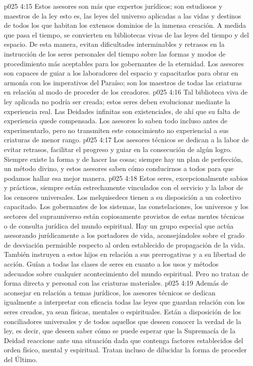 \vs p025 4:15 Estos asesores son más que expertos jurídicos; son estudiosos y maestros de la ley  esto es, las leyes del universo aplicadas a las vidas y destinos de todos los que habitan los extensos dominios de la inmensa creación. A medida que pasa el tiempo, se convierten en bibliotecas vivas de las leyes del tiempo y del espacio. De esta manera, evitan dificultades interminables y retrasos en la instrucción de los seres personales del tiempo sobre las formas y modos de procedimiento más aceptables para los gobernantes de la eternidad. Los asesores son capaces de guiar a los laboradores del espacio y capacitarlos para obrar en armonía con los imperativos del Paraíso; son los maestros de todas las criaturas en relación al modo de proceder de los creadores.
\vs p025 4:16 Tal biblioteca viva de ley aplicada no podría ser creada; estos seres deben evolucionar mediante la experiencia real. Las Deidades infinitas son existenciales, de ahí que su falta de experiencia quede compensada. Los asesores lo saben todo incluso antes de experimentarlo, pero no transmiten este conocimiento no experiencial a sus criaturas de menor rango.
\vs p025 4:17 \pc Los asesores técnicos se dedican a la labor de evitar retrasos, facilitar el progreso y guiar en la consecución de algún logro. Siempre existe la forma  y  de hacer las cosas; siempre hay un plan de perfección, un método divino, y estos asesores saben cómo conducirnos a todos para que podamos hallar esa mejor manera.
\vs p025 4:18 Estos seres, excepcionalmente sabios y prácticos, siempre están estrechamente vinculados con el servicio y la labor de los censores universales. Los melquisedecs tienen a su disposición a un colectivo capacitado. Los gobernantes de los sistemas, las constelaciones, los universos y los sectores del suprauniverso están copiosamente provistos de estas mentes técnicas o de consulta jurídica del mundo espiritual. Hay un grupo especial que actúa asesorando jurídicamente a los portadores de vida, aconsejándoles sobre el grado de desviación permisible respecto al orden establecido de propagación de la vida. También instruyen a estos hijos en relación a sus prerrogativas y a su libertad de acción. Guían a todas las clases de seres en cuanto a los usos y métodos adecuados sobre cualquier acontecimiento del mundo espiritual. Pero no tratan de forma directa y personal con las criaturas materiales.
\vs p025 4:19 Además de aconsejar en relación a temas jurídicos, los asesores técnicos se dedican igualmente a interpretar con eficacia todas las leyes que guardan relación con los seres creados, ya sean físicas, mentales o espirituales. Están a disposición de los conciliadores universales y de todos aquellos que deseen conocer la verdad de la ley, es decir, que deseen saber cómo se puede esperar que la Supremacía de la Deidad reaccione ante una situación dada que contenga factores establecidos del orden físico, mental y espiritual. Tratan incluso de dilucidar la forma de proceder del Último.
